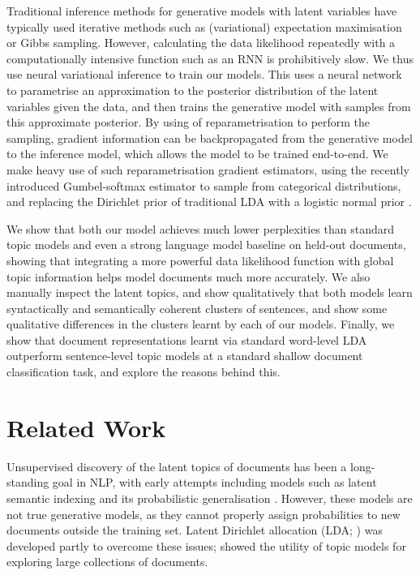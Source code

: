 Traditional inference methods for generative models with latent variables have typically used iterative methods such as (variational) expectation maximisation or Gibbs sampling. However, calculating the data likelihood repeatedly with a computationally intensive function such as an RNN is prohibitively slow. We thus use neural variational inference \citep{Rezende:14,Mnih:14,Kingma:14} to train our models. This uses a neural network to parametrise an approximation to the  posterior distribution of the latent variables given the data, and then trains the generative model with samples from this approximate posterior. By using of reparametrisation to perform the sampling, gradient information can be backpropagated from the generative model to the inference model, which allows the model to be trained end-to-end. We make heavy use of such reparametrisation gradient estimators, using the recently introduced Gumbel-softmax estimator \citep{Jang:17,Maddison:17} to sample from categorical distributions, and replacing the Dirichlet prior of traditional LDA with a logistic normal prior \citep{Mackay:98,Lafferty:06,Hennig:12,Strivastava:17}.

We show that both our model achieves much lower perplexities than standard topic models and even a strong language model baseline on held-out documents, showing that integrating a more powerful data likelihood function with global topic information helps model documents much more accurately. We also manually inspect the latent topics, and show qualitatively that both models learn syntactically and semantically coherent clusters of sentences, and show some qualitative differences in the clusters learnt by each of our models. Finally, we show that document representations learnt via standard word-level LDA outperform sentence-level topic models at a standard shallow document classification task, and explore the reasons behind this.

\section{Related Work}

Unsupervised discovery of the latent topics of documents has been a long-standing goal in NLP, with early attempts including models such as latent semantic indexing and its probabilistic generalisation \citep{Deerwester:90,Hofmann:99}. However, these models are not true generative models, as they cannot properly assign probabilities to new documents outside the training set. Latent Dirichlet allocation (LDA; \citet{Blei:03}) was developed partly to overcome these issues; \citet{Griffiths:04} showed the utility of topic models for exploring large collections of documents.

